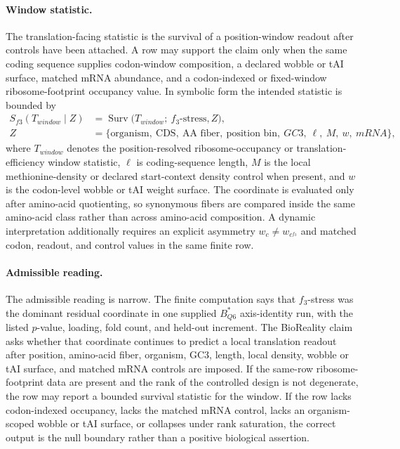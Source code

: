 \paragraph{Window statistic.}
The translation-facing statistic is the survival of a position-window readout after controls have been attached.  A row may support the claim only when the same coding sequence supplies codon-window composition, a declared wobble or tAI surface, matched mRNA abundance, and a codon-indexed or fixed-window ribosome-footprint occupancy value.  In symbolic form the intended statistic is bounded by
$$
\begin{aligned}
S_{f3}(T_{window}\mid Z)
  &= \operatorname{Surv}\bigl(T_{window};\ f_3\text{-stress}, Z\bigr),\\
Z
  &= \{\text{organism},\ \text{CDS},\ \text{AA fiber},\ \text{position bin},\ GC3,\ \ell,\ M,\ w,\ mRNA\},
\end{aligned}
$$
where $T_{window}$ denotes the position-resolved ribosome-occupancy or translation-efficiency window statistic, $\ell$ is coding-sequence length, $M$ is the local methionine-density or declared start-context density control when present, and $w$ is the codon-level wobble or tAI weight surface.  The coordinate is evaluated only after amino-acid quotienting, so synonymous fibers are compared inside the same amino-acid class rather than across amino-acid composition.  A dynamic interpretation additionally requires an explicit asymmetry $w_c \ne w_{c^{f_3}}$ and matched codon, readout, and control values in the same finite row.

\paragraph{Admissible reading.}
The admissible reading is narrow.  The finite computation says that $f_3$-stress was the dominant residual coordinate in one supplied $B^\ast_{Q6}$ axis-identity run, with the listed $p$-value, loading, fold count, and held-out increment.  The BioReality claim asks whether that coordinate continues to predict a local translation readout after position, amino-acid fiber, organism, GC3, length, local density, wobble or tAI surface, and matched mRNA controls are imposed.  If the same-row ribosome-footprint data are present and the rank of the controlled design is not degenerate, the row may report a bounded survival statistic for the window.  If the row lacks codon-indexed occupancy, lacks the matched mRNA control, lacks an organism-scoped wobble or tAI surface, or collapses under rank saturation, the correct output is the null boundary rather than a positive biological assertion.

